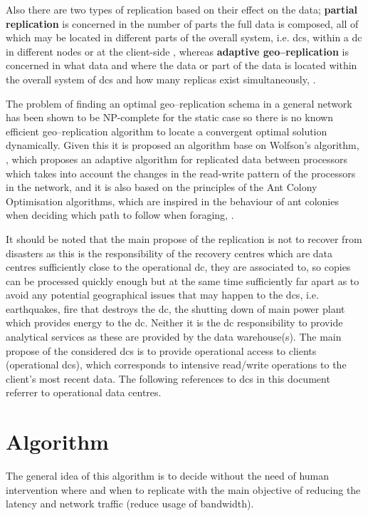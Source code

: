 \documentclass{acm_proc_article-sp}
\begin{document}
	Also there are two types of replication based on their effect on the data; {\bf partial replication} is concerned in the number of parts the full data is composed, all of which may be located in different parts of the overall system, i.e. \glspl{dc}, within a \gls{dc} in different nodes or at the client-side \cite{Briquemont2015a, Briquemont2014a, Serrano2007a}, whereas {\bf adaptive geo--replication} is concerned in what data and where the data or part of the data is located within the overall system of \glspl{dc} and how many replicas exist simultaneously, \cite{KingsyGrace2013a, Wang2012a, Abad2011a, Abdul-Wahid2007a, Loukopoulos2004a}.
	
	The problem of finding an optimal geo--replication schema in a general network has been shown to be NP-complete for the static case \cite{Apers1988a,Wolfson1997a,Wolfson1991a} so there is no known efficient geo--replication algorithm to locate a convergent optimal solution dynamically. Given this it is proposed an algorithm base on Wolfson's algorithm, \cite{Wolfson1990a}, which proposes an adaptive algorithm for replicated data between processors which takes into account the changes in the read-write pattern of the processors in the network, and it is also based on the principles of the Ant Colony Optimisation algorithms, which are inspired in the behaviour of ant colonies when deciding which path to follow when foraging, \cite{dorigo1992a}.%
	
	It should be noted that the main propose of the replication is not to recover from disasters as this is the responsibility of the recovery centres which are data centres sufficiently close to the operational \gls{dc}, they are associated to, so copies can be processed quickly enough but at the same time sufficiently far apart as to avoid any potential geographical issues that may happen to the \glspl{dc}, i.e. earthquakes, fire that destroys the \gls{dc}, the shutting down of main power plant which provides energy to the \gls{dc}. Neither it is the \gls{dc} responsibility to provide analytical services as these are provided by the data warehouse(s). The main propose of the considered \glspl{dc} is to provide operational access to clients (operational \glspl{dc}), which corresponds to intensive read/write operations to the client's most recent data. The following references to \glspl{dc} in this document referrer to operational data centres.


\section{Algorithm}
The general idea of this algorithm is to decide without the need of human intervention where and when to replicate with the main objective of reducing the latency and network traffic (reduce usage of bandwidth).
\end{document}
